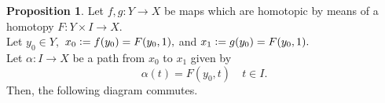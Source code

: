 \documentclass[12pt]{article}
\theoremstyle{definition}
\numberwithin{thm}{section}
\newtheorem{prop}[thm]{Proposition}
\begin{document}
\begin{prop}
	Let $f, g:Y\to X$ be maps which are homotopic by means of a homotopy $F:Y \times I \to X.$ \\
	Let $y_0 \in Y,$ $x_0 \vcentcolon= f(y_0) = F(y_0, 1),$ and $x_1 \vcentcolon= g(y_0) = F(y_0, 1).$\\
	Let $\alpha:I \to X$ be a path from $x_0$ to $x_1$ given by
	\begin{equation*} 
		\alpha(t) = F(y_0, t) \quad t \in I.
	\end{equation*}
	Then, the following diagram commutes.
	\begin{center}
	\end{center}
\end{prop}
\end{document}
